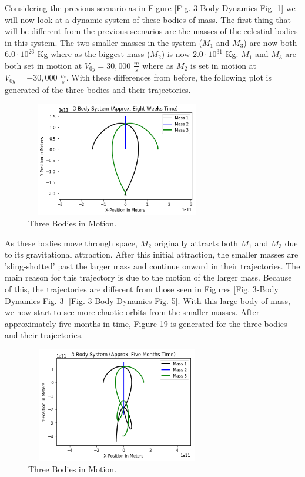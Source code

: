 \documentclass[twocolumn]{article}
\begin{document}
Considering the previous scenario as in Figure \ref{Fig. 3-Body Dynamics Fig. 1} we will now look at a dynamic system of these bodies of mass. The first thing that will be different from the previous scenarios are the masses of the celestial bodies in this system. The two smaller masses in the system ($M_1$ and $M_3$) are now both $6.0\cdot10^{26}$ Kg where as the biggest mass ($M_2$) is now $2.0\cdot10^{31}$ Kg. $M_1$ and $M_3$ are both set in motion at $V_{0y}=30,000$ $\frac{m}{s}$ where as $M_2$ is set in motion at $V_{0y}=-30,000$ $\frac{m}{s}$. With these differences from before, the following plot is generated of the three bodies and their trajectories.
\begin{figure}[h]
    \centering
    \includegraphics[width=8cm, height=5cm]{Figures/3-Body Dynamics (6).png}
    \caption{\small{Three Bodies in Motion.}}
    \label{Fig. 3-Body Dynamics Fig. 6}
\end{figure}
\par \noindent
As these bodies move through space, $M_2$ originally attracts both $M_1$ and $M_3$ due to its gravitational attraction. After this initial attraction, the smaller masses are 'sling-shotted' past the larger mass and continue onward in their trajectories. The main reason for this trajectory is due to the motion of the larger mass. Because of this, the trajectories are different from those seen in Figures \ref{Fig. 3-Body Dynamics Fig. 3}-\ref{Fig. 3-Body Dynamics Fig. 5}. With this large body of mass, we now start to see more chaotic orbits from the smaller masses. After approximately five months in time, Figure 19 is generated for the three bodies and their trajectories.
\begin{figure}[h]
    \centering
    \includegraphics[width=8cm, height=5cm]{Figures/3-Body Dynamics (7).png}
    \caption{\small{Three Bodies in Motion.}}
    \label{Fig. 3-Body Dynamics Fig. 7}
\end{figure}
\end{document}
